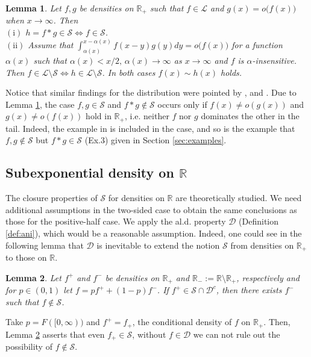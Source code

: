 \documentclass[12pt,leqno]{amsart}
\newtheorem{lemma}{Lemma}[section]
\newcommand{\R}{\mathbb{R}}
\newcommand{\cals}{{\mathcal S}}
\newcommand{\call}{{\mathcal L}}
\newcommand{\cald}{{\mathcal D}}
\newcommand{\1}{{\mathbf 1}}
\begin{document}
\begin{lemma}
\label{lem:comv:rplus}
 Let $f,g$ be densities on $\R_+$ such that $f\in \call$ and $g(x)=o\big(f(x)\big)$ when $x\to\infty$. Then \\
$(\mathrm{i})$ $h=f\ast g \in \cals \Leftrightarrow f\in\cals$. \\
$(\mathrm{ii})$ Assume that 
$\int_{\alpha(x)}^{x-\alpha(x)}f(x-y)g(y)dy=o\big(f(x)\big)$ 
for a function $\alpha(x)$ such that $\alpha(x)<x/2,\,\alpha(x)\to\infty$ as $x\to\infty$ and $f$ is $\alpha$-insensitive. 
Then $f\in \call \setminus \cals \Leftrightarrow h\in \call\setminus \cals$. 
In both cases $f(x)\sim h(x)$ holds. 
\end{lemma}
Notice that similar findings for the distribution were pointed by \cite[Proposition 1]{Embrechts:Goldie:Veraverbeke:1979}, 
\cite[Lemma 2.4]{Pakes:2004} and \cite[Proposition 1.1]{Leipus:Siaulys:2020}. 
Due to Lemma \ref{lem:comv:rplus}, the case $f,g\in \cals$ and $f\ast g\notin \cals$ occurs only if 
$f(x)\neq o(g(x))$ and $g(x)\neq o(f(x))$ hold in $\R_+$, i.e. neither $f$ nor $g$ dominates the other in the tail. 
Indeed, the example in \cite{Kluppelberg:Villasenor:1991} is included in the case, and so is 
the example that $f,g\notin \cals$ but $f\ast g\in \cals$ (Ex.3) given in Section \ref{sec:examples}. 


\subsection{Subexponential density on $\R$}
\label{sec:theory:closure:properites:two-sided}
The closure properties of $\cals$ for densities on $\R$
are theoretically studied. %
We need additional assumptions in the two-sided case 
to obtain the same conclusions as those for the positive-half case. 
We apply the al.d. property $\cald$ (Definition \ref{def:ani}), which would be a reasonable assumption. 
Indeed, one could see in the following lemma that 
$\cald$ is inevitable to extend the notion $\cals$ from densities on $\R_+$ to those on $\R$. 
\begin{lemma}
\label{lem:ani:R}
Let $f^+$ and $f^-$ be densities on $\R_+$ and $\R_-:=\R \setminus \R_+$, respectively and 
for $p\in(0,1)$ let $f=pf^++ (1-p)f^-$. If $f^+ \in \cals\cap \cald^c$, then
there exists $f^-$ such that $f \notin \cals$.
\end{lemma}
Take $p=F([0,\infty))$ and $f^+ =f_+$, the conditional density of $f$ on $\R_+$. 
Then, Lemma \ref{lem:ani:R} asserts that even $f_+\in \cals$, without $f\in \cald$ 
we can not rule out the possibility of $f\notin \cals$.  
\end{document}
